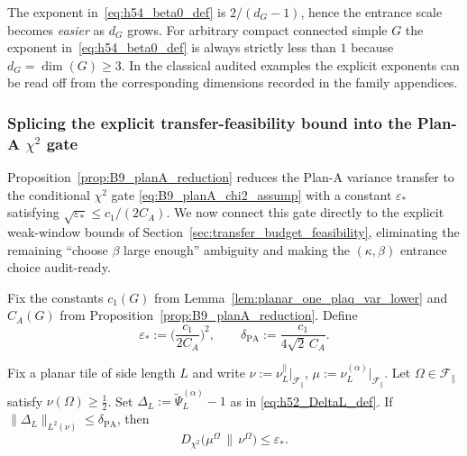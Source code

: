 \begin{remark}
The exponent in~\eqref{eq:h54_beta0_def} is $2/(d_G-1)$, hence the entrance scale becomes \emph{easier} as $d_G$ grows.
For arbitrary compact connected simple $G$ the exponent in~\eqref{eq:h54_beta0_def} is always strictly less than $1$ because $d_G=\dim(G)\ge 3$. In the classical audited examples the explicit exponents can be read off from the corresponding dimensions recorded in the family appendices.
\end{remark}


\subsubsection{Splicing the explicit transfer-feasibility bound into the Plan-A \texorpdfstring{$\chi^2$}{chi2} gate}
\label{sec:planA_gate}

Proposition~\ref{prop:B9_planA_reduction} reduces the Plan-A variance transfer to the conditional $\chi^2$ gate
\eqref{eq:B9_planA_chi2_assump} with a constant $\varepsilon_\ast$ satisfying $\sqrt{\varepsilon_\ast}\le c_1/(2C_A)$.
We now connect this gate directly to the explicit weak-window bounds of Section~\ref{sec:transfer_budget_feasibility}, eliminating the remaining
``choose $\beta$ large enough'' ambiguity and making the $(\kappa,\beta)$ entrance choice audit-ready.

\begin{definition}\label{def:h55_planA_gate_params}
Fix the constants $c_1(G)$ from Lemma~\ref{lem:planar_one_plaq_var_lower} and $C_A(G)$ from Proposition~\ref{prop:B9_planA_reduction}.
Define
\begin{equation}\label{eq:h55_epsstar_def}
\varepsilon_\ast:=\Big(\frac{c_1}{2C_A}\Big)^2,
\qquad
\delta_{\mathrm{PA}}:=\frac{c_1}{4\sqrt2\,C_A}.
\end{equation}
\end{definition}

\begin{lemma}\label{lem:h55_L2_to_planA_chi2_gate}
Fix a planar tile of side length $L$ and write $\nu:=\nu_L^{\parallel}|_{\mathscr F_{\parallel}}$,
$\mu:=\nu_L^{(\alpha)}|_{\mathscr F_{\parallel}}$.
Let $\Omega\in\mathscr F_{\parallel}$ satisfy $\nu(\Omega)\ge \tfrac12$.
Set $\Delta_L:=\widetilde\Psi_L^{(\alpha)}-1$ as in \eqref{eq:h52_DeltaL_def}.
If $\|\Delta_L\|_{L^2(\nu)}\le \delta_{\mathrm{PA}}$, then
\begin{equation}\label{eq:h55_planA_gate_conclusion}
D_{\chi^2}\!\bigl(\mu^{\Omega}\,\|\,\nu^{\Omega}\bigr)
\le \varepsilon_\ast .
\end{equation}
\end{lemma}

